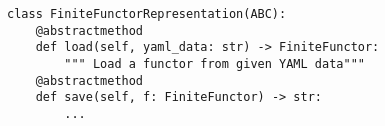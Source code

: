 \par\begin{minipage}{60ex}
\begin{verbatim}
class FiniteFunctorRepresentation(ABC):
    @abstractmethod
    def load(self, yaml_data: str) -> FiniteFunctor:
        """ Load a functor from given YAML data"""
    @abstractmethod
    def save(self, f: FiniteFunctor) -> str:
        ...
\end{verbatim}
\end{minipage}\par